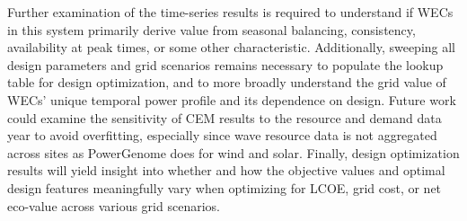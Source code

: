 Further examination of the time-series results is required to understand if WECs in this system primarily derive value from seasonal balancing, consistency, availability at peak times, or some other characteristic.
Additionally, sweeping all design parameters and grid scenarios remains necessary to populate the lookup table for design optimization, and to more broadly understand the grid value of WECs' unique temporal power profile and its dependence on design.
Future work could examine the sensitivity of CEM results to the resource and demand data year to avoid overfitting, especially since wave resource data is not aggregated across sites as PowerGenome does for wind and solar.
Finally, design optimization results will yield insight into whether and how the objective values and optimal design features meaningfully vary when optimizing for LCOE, grid cost, or net eco-value across various grid scenarios.



